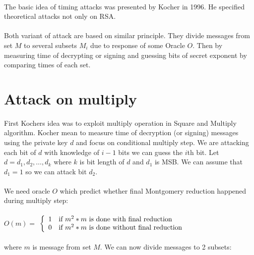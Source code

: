 \documentclass[thesis=B,english]{FITthesis}[2012/10/20]
\begin{document}
{\paragraph*{}{
The basic idea of timing attacks was presented by Kocher in 1996. He specified theoretical attacks not only on RSA.
}

\paragraph*{}{
Both variant of attack are based on similar principle. They divide messages from set \(M\) to several subsets \(M_i\) due to response of some Oracle \(O\). Then by measuring time of decrypting or signing and 
guessing bits of secret exponent by comparing times of each set.
}
\section{Attack on multiply}
\paragraph*{}{
First Kochers idea was to exploit multiply operation in Square and Multiply algorithm. Kocher mean to measure time of decryption (or signing) messages using the private key \(d\) 
and focus on conditional multiply step. We are attacking each bit of \(d\) with knowledge of \( i-1\) bits we can guess the \(i\)th bit. Let \(d = d_1,d_2, \ldots ,d_k \) where \(k\) is bit length of \(d\) and \(d_1\) is MSB. 
We can assume that \( d_1 = 1\) so we can attack bit \(d_2\).
}
\paragraph*{}{
We need oracle \(O\) which predict whether final Montgomery reduction happened during multiply step:
}
\paragraph*{}

\( O(m) =\) $\left\{
  \begin{array}{cl}
    \text{1} & \text{\mbox{if}  \(m^2 * m\) is done with final reduction} \\
    \text{0} & \text{\mbox{if}  \(m^2 * m\) is done without final reduction} 
  \end{array}
\right.$

\paragraph*{}
{
where \(m\) is message from set \(M\). We can now divide messages to 2 subsets:}

}
\end{document}
